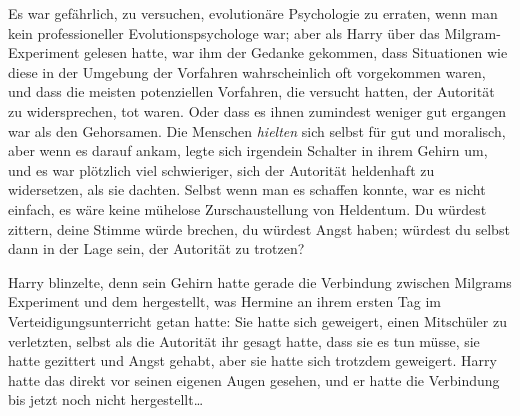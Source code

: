Es war gefährlich, zu versuchen, evolutionäre Psychologie zu erraten, wenn man kein professioneller Evolutionspsychologe war; aber als Harry über das Milgram-Experiment gelesen hatte, war ihm der Gedanke gekommen, dass Situationen wie diese in der Umgebung der Vorfahren wahrscheinlich oft vorgekommen waren, und dass die meisten potenziellen Vorfahren, die versucht hatten, der Autorität zu widersprechen, tot waren. Oder dass es ihnen zumindest weniger gut ergangen war als den Gehorsamen. Die Menschen \emph{hielten} sich selbst für gut und moralisch, aber wenn es darauf ankam, legte sich irgendein Schalter in ihrem Gehirn um, und es war plötzlich viel schwieriger, sich der Autorität heldenhaft zu widersetzen, als sie dachten. Selbst wenn man es schaffen konnte, war es nicht einfach, es wäre keine mühelose Zurschaustellung von Heldentum. Du würdest zittern, deine Stimme würde brechen, du würdest Angst haben; würdest du selbst dann in der Lage sein, der Autorität zu trotzen?

Harry blinzelte, denn sein Gehirn hatte gerade die Verbindung zwischen Milgrams Experiment und dem hergestellt, was Hermine an ihrem ersten Tag im Verteidigungsunterricht getan hatte: Sie hatte sich geweigert, einen Mitschüler zu verletzten, selbst als die Autorität ihr gesagt hatte, dass sie es tun müsse, sie hatte gezittert und Angst gehabt, aber sie hatte sich trotzdem geweigert. Harry hatte das direkt vor seinen eigenen Augen gesehen, und er hatte die Verbindung bis jetzt noch nicht hergestellt…

